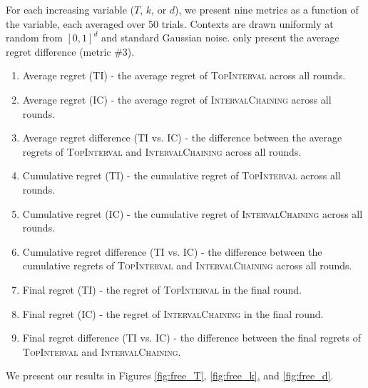 \documentclass[11pt]{article}
\begin{document}
For each increasing variable ($T$, $k$, or $d$), we present nine metrics as a function of the variable, each averaged over 50 trials. Contexts are drawn uniformly at random from $[0,1]^d$ and standard Gaussian noise.  only present the average regret difference (metric \#3).
\begin{enumerate}
	\item Average regret (TI) - the average regret of \textsc{TopInterval} across all rounds.
	\item Average regret (IC) - the average regret of \textsc{IntervalChaining} across all rounds.
	\item Average regret difference (TI vs. IC) - the difference between the average regrets of \textsc{TopInterval} and \textsc{IntervalChaining} across all rounds.
	\item Cumulative regret (TI) - the cumulative regret of \textsc{TopInterval} across all rounds.
	\item Cumulative regret (IC) - the cumulative regret of \textsc{IntervalChaining} across all rounds.
	\item Cumulative regret difference (TI vs. IC) - the difference between the cumulative regrets of \textsc{TopInterval} and \textsc{IntervalChaining} across all rounds.
	\item Final regret (TI) - the regret of \textsc{TopInterval} in the final round.
	\item Final regret (IC) - the regret of \textsc{IntervalChaining} in the final round.
	\item Final regret difference (TI vs. IC) - the difference between the final regrets of \textsc{TopInterval} and \textsc{IntervalChaining}.
\end{enumerate}

We present our results in Figures \ref{fig:free_T}, \ref{fig:free_k}, and \ref{fig:free_d}.
\end{document}
